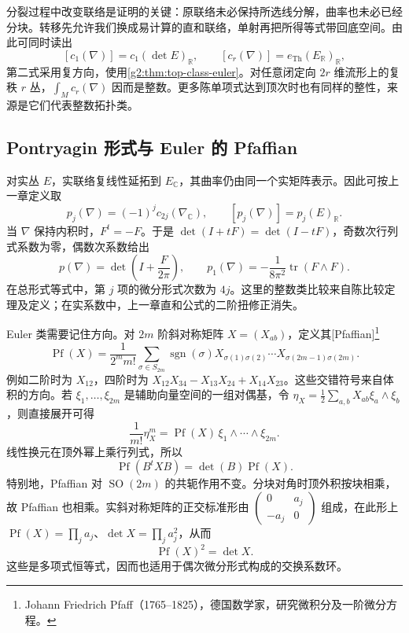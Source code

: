 分裂过程中改变联络是证明的关键：原联络未必保持所选线分解，曲率也未必已经分块。转移先允许我们换成易计算的直和联络，单射再把所得等式带回底空间。由此可同时读出
\[
	[c_1(\nabla)]=c_1(\det E)_{\mathbb R},\qquad
	[c_r(\nabla)]=e_{\mathrm{Th}}(E_{\mathbb R})_{\mathbb R},
\]
第二式采用复方向，使用\cref{g2:thm:top-class-euler}。对任意闭定向 \(2r\) 维流形上的复秩 \(r\) 丛，\(\int_Mc_r(\nabla)\) 因而是整数。更多陈单项式达到顶次时也有同样的整性，来源是它们代表整数拓扑类。

\subsection{Pontryagin 形式与 Euler 的 Pfaffian}
\label{g2:subsec:2203:03}
对实丛 \(E\)，实联络复线性延拓到 \(E_{\mathbb C}\)，其曲率仍由同一个实矩阵表示。因此可按上一章定义取
\begin{equation}\label{g2:eq:pontryagin-curvature-forms}
	p_j(\nabla)=(-1)^j c_{2j}(\nabla_{\mathbb C}),\qquad
	[p_j(\nabla)]=p_j(E)_{\mathbb R}.
\end{equation}
当 \(\nabla\) 保持内积时，\(F^t=-F\)。于是 \(\det(I+tF)=\det(I-tF)\)，奇数次行列式系数为零，偶数次系数给出
\begin{equation}\label{g2:eq:pontryagin-determinant-form}
	p(\nabla)=\det\!\left(I+\frac{F}{2\pi}\right),\qquad
	p_1(\nabla)=-\frac1{8\pi^2}\operatorname{tr}(F\wedge F).
\end{equation}
在总形式等式中，第 \(j\) 项的微分形式次数为 \(4j\)。这里的整数类比较来自陈比较定理及定义；在实系数中，上一章直和公式的二阶扭修正消失。

\ProseParagraphBreak

Euler 类需要记住方向。对 \(2m\) 阶斜对称矩阵 \(X=(X_{ab})\)，定义其[Pfaffian]\footnote{Johann Friedrich Pfaff（1765--1825），德国数学家，研究微积分及一阶微分方程。}
\begin{equation}\label{g2:eq:pfaffian-definition}
	\operatorname{Pf}(X)=\frac1{2^m m!}\sum_{\sigma\in S_{2m}}\operatorname{sgn}(\sigma)
	X_{\sigma(1)\sigma(2)}\cdots X_{\sigma(2m-1)\sigma(2m)}.
\end{equation}
例如二阶时为 \(X_{12}\)，四阶时为 \(X_{12}X_{34}-X_{13}X_{24}+X_{14}X_{23}\)。这些交错符号来自体积的方向。若 \(\xi_1,\ldots,\xi_{2m}\) 是辅助向量空间的一组对偶基，令 \(\eta_X=\frac12\sum_{a,b}X_{ab}\xi_a\wedge\xi_b\)，则直接展开可得
\[
	\frac1{m!}\eta_X^m=\operatorname{Pf}(X)\,\xi_1\wedge\cdots\wedge\xi_{2m}.
\]
线性换元在顶外幂上乘行列式，所以
\[
	\operatorname{Pf}(B^tXB)=\det(B)\operatorname{Pf}(X).
\]
特别地，Pfaffian 对 \(\operatorname{SO}(2m)\) 的共轭作用不变。分块对角时顶外积按块相乘，故 Pfaffian 也相乘。实斜对称矩阵的正交标准形由 \(\left(\begin{smallmatrix}0&a_j\\-a_j&0\end{smallmatrix}\right)\) 组成，在此形上 \(\operatorname{Pf}(X)=\prod_j a_j\)、\(\det X=\prod_j a_j^2\)，从而
\begin{equation}\label{g2:eq:pfaffian-square}
	\operatorname{Pf}(X)^2=\det X.
\end{equation}
这些是多项式恒等式，因而也适用于偶次微分形式构成的交换系数环。

